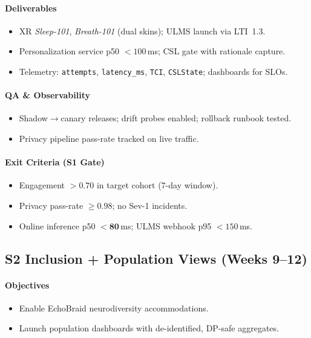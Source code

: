 \documentclass[11pt]{article}
\theoremstyle{plain}
\begin{document}
\paragraph{Deliverables}
\begin{itemize}
  \item XR \emph{Sleep-101}, \emph{Breath-101} (dual skins); ULMS launch via LTI~1.3.
  \item Personalization service p50 $<100$\,ms; CSL gate with rationale capture.
  \item Telemetry: \texttt{attempts}, \texttt{latency\_ms}, \texttt{TCI}, \texttt{CSLState}; dashboards for SLOs.
\end{itemize}
\paragraph{QA \& Observability}
\begin{itemize}
  \item Shadow$\rightarrow$canary releases; drift probes enabled; rollback runbook tested.
  \item Privacy pipeline pass-rate tracked on live traffic.
\end{itemize}
\paragraph{Exit Criteria (S1 Gate)}
\begin{itemize}
  \item Engagement $\mathbf{>0.70}$ in target cohort (7-day window).
  \item Privacy pass-rate $\mathbf{\ge 0.98}$; no Sev-1 incidents.
  \item Online inference p50 $\mathbf{<80}$\,ms; ULMS webhook p95 $<150$\,ms.
\end{itemize}

\subsection{S2 Inclusion + Population Views (Weeks 9--12)}
\paragraph{Objectives}
\begin{itemize}
  \item Enable EchoBraid neurodiversity accommodations.
  \item Launch population dashboards with de-identified, DP-safe aggregates.
\end{itemize}
\end{document}
